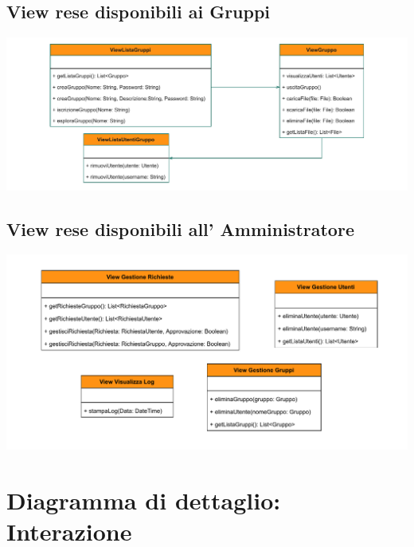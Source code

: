 \subsection*{View rese disponibili ai Gruppi}
\begin{adjustwidth}{-3cm}{0cm}
\includegraphics[scale=0.9]{progettazione/Progettazione-Interfacce Disponibili ai Gruppi.drawio.pdf}
\end{adjustwidth}
\vspace{0.5cm}


\subsection*{View rese disponibili all' Amministratore}
\begin{adjustwidth}{-2.5cm}{0cm}
\includegraphics[scale=0.9]{progettazione/Progettazione-Interfacce Disponibili all' Amministratore.drawio.pdf}
\end{adjustwidth}
\vspace{0.5cm}


\section*{Diagramma di dettaglio: Interazione}
{}
\vspace{0.5cm}



